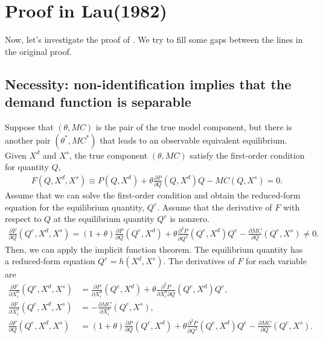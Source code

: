 \documentclass[11pt, a4paper]{article}
\theoremstyle{remark}
\begin{document}
\section{Proof in Lau(1982)}\label{sec:proof_lau}
Now, let's investigate the proof of \citet{lau1982identifying}.
We try to fill some gaps between the lines in the original proof.






\subsection{Necessity: non-identification implies that the demand function is separable}

Suppose that $(\theta, MC)$ is the pair of the true model component, but there is another pair $(\theta^{*}, MC^{*})$ that leads to an observable equivalent equilibrium.
Given $X^{d}$ and $X^{s}$, the true component $(\theta, MC)$ satisfy the first-order condition for quantity $Q$,
\begin{align}
    F(Q, X^{d}, X^{s}) \equiv P(Q, X^{d}) + \theta\frac{\partial P}{\partial Q}(Q, X^{d})Q - MC(Q, X^{s}) = 0.
\end{align}
Assume that we can solve the first-order condition and obtain the reduced-form equation for the equilibrium quantity, $Q^e$.
Assume that the derivative of $F$ with respect to $Q$ at the equilibrium quantity $Q^e$ is nonzero.
\begin{align}
    \frac{\partial F}{\partial Q}(Q^e, X^{d}, X^{s}) = (1+\theta)\frac{\partial P}{\partial Q}(Q^e, X^{d}) + \theta\frac{\partial^2 P}{\partial Q^2}(Q^e, X^{d})Q^e - \frac{\partial MC}{\partial Q}(Q^e, X^{s}) \ne 0.
\end{align}
Then, we can apply the implicit function theorem. 
The equilibrium quantity has a reduced-form equation $Q^e = h(X^{d}, X^{s})$.
The derivatives of $F$ for each variable are
\begin{align}
    \frac{\partial F}{\partial X^{d}_i}(Q^e, X^{d}, X^{s}) & =  \frac{\partial P}{\partial X^{d}_{i}}(Q^e, X^{d}) + \theta\frac{\partial^2 P}{\partial X^{d}_{i}\partial Q}(Q^e, X^{d})Q^e,\\
    \frac{\partial F}{\partial X^{s}_i}(Q^e, X^{d}, X^{s}) & =  -\frac{\partial MC}{\partial X^{s}_{i}}(Q^e, X^{s}),\\
    \frac{\partial F}{\partial Q}(Q^e, X^{d}, X^{s}) & = (1+\theta)\frac{\partial P}{\partial Q}(Q^e, X^{d}) + \theta\frac{\partial^2 P}{\partial Q^2}(Q^e, X^{d})Q^e - \frac{\partial MC}{\partial Q}(Q^e, X^{s}).
\end{align}
\end{document}
